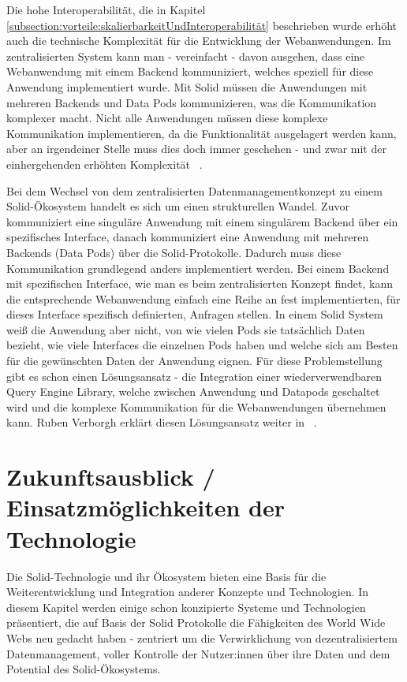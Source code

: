 \documentclass[acmtog]{acmart}
\begin{document}
Die hohe Interoperabilität, die in Kapitel \ref{subsection:vorteile:skalierbarkeitUndInteroperabilität} beschrieben wurde erhöht auch die technische Komplexität für die Entwicklung der Webanwendungen. Im zentralisierten System kann man - vereinfacht - davon ausgehen, dass eine Webanwendung mit einem Backend kommuniziert, welches speziell für diese Anwendung implementiert wurde. Mit Solid müssen die Anwendungen mit mehreren Backends und Data Pods kommunizieren, was die Kommunikation komplexer macht. Nicht alle Anwendungen müssen diese komplexe Kommunikation implementieren, da die Funktionalität ausgelagert werden kann, aber an irgendeiner Stelle muss dies doch immer geschehen - und zwar mit der einhergehenden erhöhten Komplexität ~\cite{MarcoNeumann.2021}.

Bei dem Wechsel von dem zentralisierten Datenmanagementkonzept zu einem Solid-Ökosystem handelt es sich um einen strukturellen Wandel. Zuvor kommuniziert eine singuläre Anwendung mit einem singulärem Backend über ein spezifisches Interface, danach kommuniziert eine Anwendung mit mehreren Backends (Data Pods) über die Solid-Protokolle. Dadurch muss diese Kommunikation grundlegend anders implementiert werden. Bei einem Backend mit spezifischen Interface, wie man es beim zentralisierten Konzept findet, kann die entsprechende Webanwendung einfach eine Reihe an fest implementierten, für dieses Interface spezifisch definierten, Anfragen stellen. In einem Solid System weiß die Anwendung aber nicht, von wie vielen Pods sie tatsächlich Daten bezieht, wie viele Interfaces die einzelnen Pods haben und welche sich am Besten für die gewünschten Daten der Anwendung eignen. Für diese Problemstellung gibt es schon einen Lösungsansatz - die Integration einer wiederverwendbaren Query Engine Library, welche zwischen Anwendung und Datapods geschaltet wird und die komplexe Kommunikation für die Webanwendungen übernehmen kann. Ruben Verborgh erklärt diesen Lösungsansatz weiter in  ~\cite{MarcoNeumann.2021}.

\section{Zukunftsausblick / Einsatzmöglichkeiten der Technologie} \label{section:zukunftsausblick}

Die Solid-Technologie und ihr Ökosystem bieten eine Basis für die Weiterentwicklung und Integration anderer Konzepte und Technologien. In diesem Kapitel werden einige schon konzipierte Systeme und Technologien präsentiert, die auf Basis der Solid Protokolle die Fähigkeiten des World Wide Webs neu gedacht haben - zentriert um die Verwirklichung von dezentralisiertem Datenmanagement, voller Kontrolle der Nutzer:innen über ihre Daten und dem Potential des Solid-Ökosystems.
\end{document}
